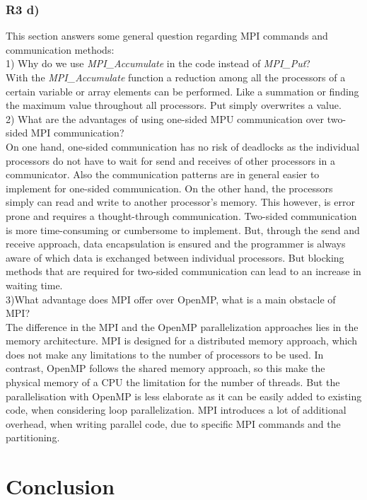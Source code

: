 \documentclass[a4paper, 11pt, oneside]{scrartcl}
\begin{document}
\subsubsection{R3 d)}

This section answers some general question regarding MPI commands and communication methods:\\

1) Why do we use \textit{MPI\_Accumulate} in the code instead of \textit{MPI\_Put}?\\

With the \textit{MPI\_Accumulate} function a reduction among all the processors of a certain variable or array elements can be performed. Like a summation or finding the maximum value throughout all processors. Put simply overwrites a value.\\

2) What are the advantages of using one-sided MPU communication over two-sided MPI communication?\\

On one hand, one-sided communication has no risk of deadlocks as the individual processors do not have to wait for send and receives of other processors in a communicator. Also the communication patterns are in general easier to implement for one-sided communication. On the other hand, the processors simply can read and write to another processor's memory. This however, is error prone and requires a thought-through communication. 
Two-sided communication is more time-consuming or cumbersome to implement. But, through the send and receive approach, data encapsulation is ensured and the programmer is always aware of which data is exchanged between individual processors. But blocking methods that are required for two-sided communication can lead to an increase in waiting time.\\

3)What advantage does MPI offer over OpenMP, what is a main obstacle of MPI?\\

The difference in the MPI and the OpenMP parallelization approaches lies in the memory architecture. MPI is designed for a distributed memory approach, which does not make any limitations to the number of processors to be used. In contrast, OpenMP follows the shared memory approach, so this make the physical memory of a CPU the limitation for the number of threads. But the parallelisation with OpenMP is less elaborate as it can be easily added to existing code, when considering loop parallelization. MPI introduces a lot of additional overhead, when writing parallel code, due to specific MPI commands and the partitioning.


\section{Conclusion}

\blindtext


%

\end{document}
